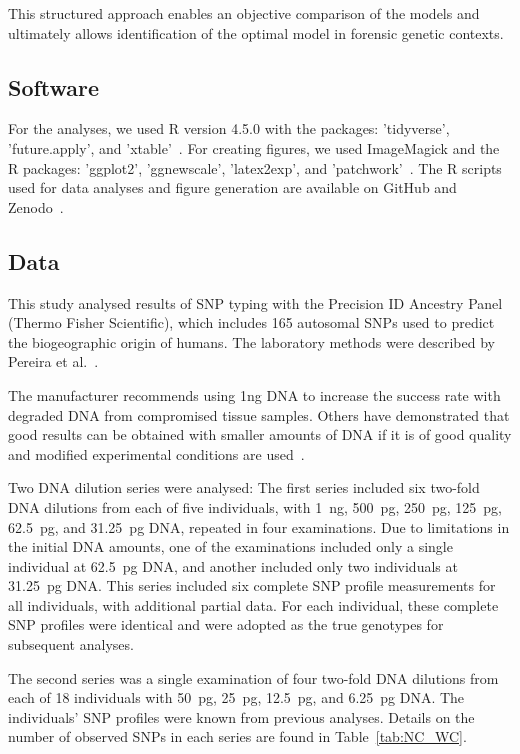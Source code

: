 \documentclass[preprint,5p,times,11pt]{elsarticle}
\begin{document}
This structured approach enables an objective comparison of the models and ultimately allows identification of the optimal model in forensic genetic contexts.


\subsection{Software}
For the analyses, we used R version 4.5.0 with the packages: 'tidyverse', 'future.apply', and 'xtable'~\cite{r, tidyverse1, tidyverse2, future1, future2, futureapply, xtable}.
For creating figures, we used ImageMagick and the R packages: 'ggplot2', 'ggnewscale', 'latex2exp', and 'patchwork'~\cite{imagemagick, ggplot, ggnewscale, latex2exp, patchwork}.
The R scripts used for data analyses and figure generation are available on GitHub and Zenodo~\cite{scripts}.


\subsection{Data}
This study analysed results of SNP typing with the Precision ID Ancestry Panel (Thermo Fisher Scientific), which includes 165 autosomal SNPs used to predict the biogeographic origin of humans.
The laboratory methods were described by Pereira et al.~\cite{pereira}.

The manufacturer recommends using 1ng DNA to increase the success rate with degraded DNA from compromised tissue samples.
Others have demonstrated that good results can be obtained with smaller amounts of DNA if it is of good quality and modified experimental conditions are used~\cite{alasfi}.

Two DNA dilution series were analysed:
The first series included six two-fold DNA dilutions from each of five individuals, with \SI{1}{\ng}, \SI{500}{\pg}, \SI{250}{\pg}, \SI{125}{\pg}, \SI{62.5}{\pg}, and \SI{31.25}{\pg} DNA, repeated in four examinations.
Due to limitations in the initial DNA amounts, one of the examinations included only a single individual at \SI{62.5}{\pg} DNA, and another included only two individuals at \SI{31.25}{\pg} DNA.
This series included six complete SNP profile measurements for all individuals, with additional partial data.
For each individual, these complete SNP profiles were identical and were adopted as the true genotypes for subsequent analyses.

The second series was a single examination of four two-fold DNA dilutions from each of 18 individuals with \SI{50}{\pg}, \SI{25}{\pg}, \SI{12.5}{\pg}, and \SI{6.25}{\pg} DNA.
The individuals' SNP profiles were known from previous analyses.
Details on the number of observed SNPs in each series are found in Table~\ref{tab:NC_WC}.
\end{document}
